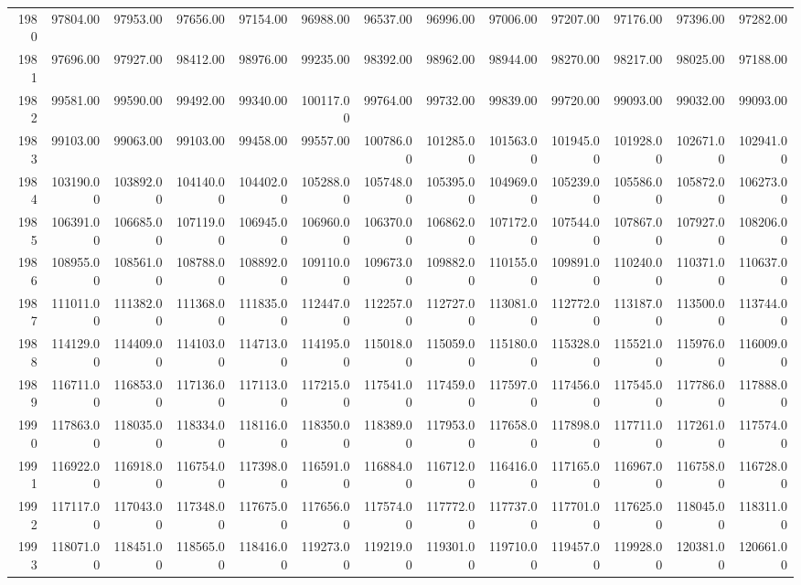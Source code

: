 \begin{longtable}{rrrrrrrrrrrrr}
  1980 & 97804.00 & 97953.00 & 97656.00 & 97154.00 & 96988.00 & 96537.00 & 96996.00 & 97006.00 & 97207.00 & 97176.00 & 97396.00 & 97282.00 \\ 
  1981 & 97696.00 & 97927.00 & 98412.00 & 98976.00 & 99235.00 & 98392.00 & 98962.00 & 98944.00 & 98270.00 & 98217.00 & 98025.00 & 97188.00 \\ 
  1982 & 99581.00 & 99590.00 & 99492.00 & 99340.00 & 100117.00 & 99764.00 & 99732.00 & 99839.00 & 99720.00 & 99093.00 & 99032.00 & 99093.00 \\ 
  1983 & 99103.00 & 99063.00 & 99103.00 & 99458.00 & 99557.00 & 100786.00 & 101285.00 & 101563.00 & 101945.00 & 101928.00 & 102671.00 & 102941.00 \\ 
  1984 & 103190.00 & 103892.00 & 104140.00 & 104402.00 & 105288.00 & 105748.00 & 105395.00 & 104969.00 & 105239.00 & 105586.00 & 105872.00 & 106273.00 \\ 
  1985 & 106391.00 & 106685.00 & 107119.00 & 106945.00 & 106960.00 & 106370.00 & 106862.00 & 107172.00 & 107544.00 & 107867.00 & 107927.00 & 108206.00 \\ 
  1986 & 108955.00 & 108561.00 & 108788.00 & 108892.00 & 109110.00 & 109673.00 & 109882.00 & 110155.00 & 109891.00 & 110240.00 & 110371.00 & 110637.00 \\ 
  1987 & 111011.00 & 111382.00 & 111368.00 & 111835.00 & 112447.00 & 112257.00 & 112727.00 & 113081.00 & 112772.00 & 113187.00 & 113500.00 & 113744.00 \\ 
  1988 & 114129.00 & 114409.00 & 114103.00 & 114713.00 & 114195.00 & 115018.00 & 115059.00 & 115180.00 & 115328.00 & 115521.00 & 115976.00 & 116009.00 \\ 
  1989 & 116711.00 & 116853.00 & 117136.00 & 117113.00 & 117215.00 & 117541.00 & 117459.00 & 117597.00 & 117456.00 & 117545.00 & 117786.00 & 117888.00 \\ 
  1990 & 117863.00 & 118035.00 & 118334.00 & 118116.00 & 118350.00 & 118389.00 & 117953.00 & 117658.00 & 117898.00 & 117711.00 & 117261.00 & 117574.00 \\ 
  1991 & 116922.00 & 116918.00 & 116754.00 & 117398.00 & 116591.00 & 116884.00 & 116712.00 & 116416.00 & 117165.00 & 116967.00 & 116758.00 & 116728.00 \\ 
  1992 & 117117.00 & 117043.00 & 117348.00 & 117675.00 & 117656.00 & 117574.00 & 117772.00 & 117737.00 & 117701.00 & 117625.00 & 118045.00 & 118311.00 \\ 
  1993 & 118071.00 & 118451.00 & 118565.00 & 118416.00 & 119273.00 & 119219.00 & 119301.00 & 119710.00 & 119457.00 & 119928.00 & 120381.00 & 120661.00 \\ 

\end{longtable}
